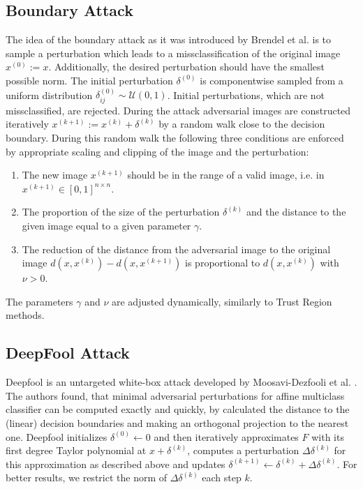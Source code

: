 \documentclass{article}
\begin{document}
\subsection{Boundary Attack}

The idea of the boundary attack as it was introduced by Brendel et al.  is to sample a perturbation which leads to a missclassification of the original image $x^{(0)}:=x$. Additionally, the desired perturbation should have the smallest possible norm. The initial perturbation $\delta^{(0)}$ is componentwise sampled from a uniform distribution $\delta^{(0)}_{ij}\sim \mathcal{U}(0,1)$. Initial perturbations, which are not missclassified, are rejected. During the attack adversarial images are constructed iteratively $x^{(k+1)}:= x^{(k)}+\delta^{(k)}$ by a random walk close to the decision boundary. During this random walk the following three conditions are enforced by appropriate scaling and clipping of the image and the perturbation:
\begin{enumerate}
	\item The new image $x^{(k+1)}$ should be in the range of a valid image, i.e. in $x^{(k+1)}\in [0,1]^{n\times n}$.
	\item The proportion of the size of the perturbation $\delta^{(k)}$ and the distance to the given image equal to a given parameter $\gamma$.
	\item The reduction of the distance from the adversarial image to the original image $d(x, x^{(k)})-d(x, x^{(k+1)})$ is proportional to $d(x, x^{(k)})$ with $\nu>0$.
\end{enumerate}
The parameters $\gamma$ and $\nu$ are adjusted dynamically, similarly to Trust Region methods.


\subsection{DeepFool Attack}
Deepfool is an untargeted white-box attack developed by Moosavi-Dezfooli et al. .
The authors found, that minimal adversarial perturbations for affine multiclass classifier can be computed exactly and quickly,
by calculated the distance to the (linear) decision boundaries and making an orthogonal projection to the nearest one.
Deepfool initializes $\delta^{(0)} \gets 0$ and then iteratively approximates $F$ with its first degree Taylor polynomial at $x + \delta^{(k)}$, computes a perturbation $\Delta \delta^{(k)}$ for this approximation as described above and updates $\delta^{(k+1)} \gets \delta^{(k)} + \Delta \delta^{(k)} $.
For better results, we restrict the norm of $\Delta \delta^{(k)} $ each step $k$.
\end{document}
